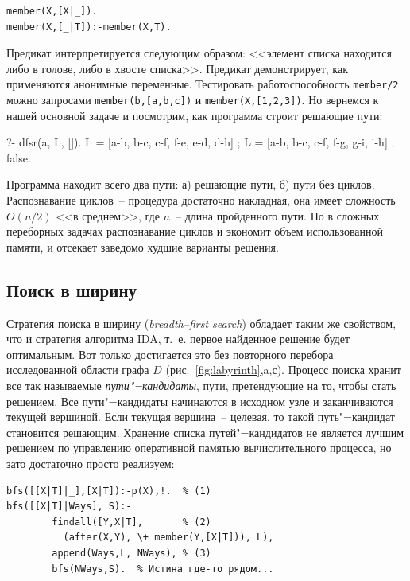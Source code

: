 \documentclass[a4paper,14pt, openany, twoside, draft]{extbook} %
\newcommand{\eeng}[1]{\emph{\foreignlanguage{english}{#1}}}
\begin{document}
\begin{verbatim}
member(X,[X|_]).
member(X,[_|T]):-member(X,T).
\end{verbatim}


Предикат интерпретируется следующим образом: <<элемент списка находится либо в голове, либо в хвосте списка>>.  Предикат демонстрирует, как применяются анонимные переменные.  Тестировать работоспособность \texttt{member/2} можно запросами \texttt{member(b,[a,b,c])} и \texttt{member(X,[1,2,3])}.  Но вернемся к нашей основной задаче и посмотрим, как программа строит решающие пути:

\begin{proexp}
?- dfsr(a, L, []).
L = [a-b, b-c, c-f, f-e, e-d, d-h] ;
L = [a-b, b-c, c-f, f-g, g-i, i-h] ;
false.
\end{proexp}


Программа находит всего два пути: а) решающие пути, б) пути без циклов.  Распознавание циклов~-- процедура достаточно накладная, она имеет сложность $O(n/2)$ <<в среднем>>, где $n$~-- длина пройденного пути.  Но в сложных переборных задачах \cite{monograph} распознавание циклов и экономит объем использованной памяти, и отсекает заведомо худшие варианты решения.

\subsection{Поиск в ширину}
\label{sec:breadthfirst}

Стратегия поиска в ширину (\eeng{breadth--first search}) обладает таким же свойством, что и стратегия алгоритма IDA, т.~е. первое найденное решение будет оптимальным.  Вот только достигается это без повторного перебора исследованной области графа $D$ (рис.~\ref{fig:labyrinth},a,с).  Процесс поиска хранит все так называемые \emph{пути"=кандидаты}, пути, претендующие на то, чтобы стать решением.  Все пути"=кандидаты начинаются в исходном узле и заканчиваются текущей вершиной.  Если текущая вершина~-- целевая, то такой путь"=кандидат становится решающим.  Хранение списка путей"=кандидатов не является лучшим решением по управлению оперативной памятью вычислительного процесса, но зато достаточно просто реализуем:

\begin{verbatim}
bfs([[X|T]|_],[X|T]):-p(X),!.  % (1)
bfs([[X|T]|Ways], S):-
        findall([Y,X|T],       % (2)
          (after(X,Y), \+ member(Y,[X|T])), L),
        append(Ways,L, NWays), % (3)
        bfs(NWays,S).  % Истина где-то рядом...
\end{verbatim}
\end{document}
